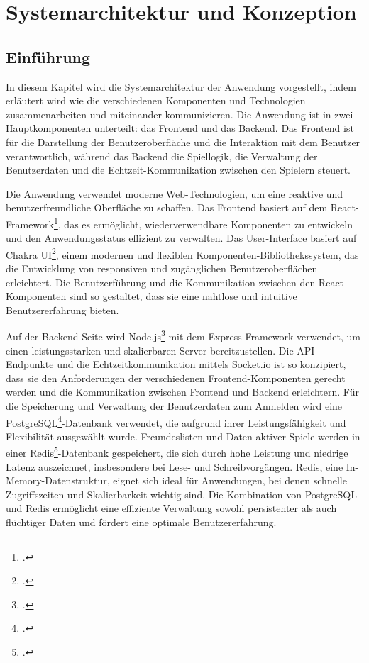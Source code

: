        
\chapter{Systemarchitektur und Konzeption}
\section{Einführung}
In diesem Kapitel wird die Systemarchitektur der Anwendung vorgestellt, indem erläutert wird wie die verschiedenen Komponenten und Technologien zusammenarbeiten und miteinander kommunizieren.
Die Anwendung ist in zwei Hauptkomponenten unterteilt: das Frontend und das Backend. Das Frontend ist für die Darstellung der Benutzeroberfläche und die Interaktion mit dem Benutzer verantwortlich, während das Backend die Spiellogik, die Verwaltung der Benutzerdaten und die Echtzeit-Kommunikation zwischen den Spielern steuert.

Die Anwendung verwendet moderne Web-Technologien, um eine reaktive und benutzerfreundliche Oberfläche zu schaffen. Das Frontend basiert auf dem React-Framework\footcite{react}, das es ermöglicht, wiederverwendbare Komponenten zu entwickeln und den Anwendungsstatus effizient zu verwalten. Das User-Interface basiert auf Chakra UI\footcite{chakraui}, einem modernen und flexiblen Komponenten-Bibliothekssystem, das die Entwicklung von responsiven und zugänglichen Benutzeroberflächen erleichtert. Die Benutzerführung und die Kommunikation zwischen den React-Komponenten sind so gestaltet, dass sie eine nahtlose und intuitive Benutzererfahrung bieten.

Auf der Backend-Seite wird Node.js\footcite{nodejs} mit dem Express-Framework verwendet, um einen leistungsstarken und skalierbaren Server bereitzustellen. Die API-Endpunkte und die Echtzeitkommunikation mittels Socket.io ist so konzipiert, dass sie den Anforderungen der verschiedenen Frontend-Komponenten gerecht werden und die Kommunikation zwischen Frontend und Backend erleichtern. Für die Speicherung und Verwaltung der Benutzerdaten zum Anmelden wird eine PostgreSQL\footcite{postgresql}-Datenbank verwendet, die aufgrund ihrer Leistungsfähigkeit und Flexibilität ausgewählt wurde. Freundeslisten und Daten aktiver Spiele werden in einer Redis\footcite{redis}-Datenbank gespeichert, die sich durch hohe Leistung und niedrige Latenz auszeichnet, insbesondere bei Lese- und Schreibvorgängen. Redis, eine In-Memory-Datenstruktur, eignet sich ideal für Anwendungen, bei denen schnelle Zugriffszeiten und Skalierbarkeit wichtig sind. Die Kombination von PostgreSQL und Redis ermöglicht eine effiziente Verwaltung sowohl persistenter als auch flüchtiger Daten und fördert eine optimale Benutzererfahrung.
